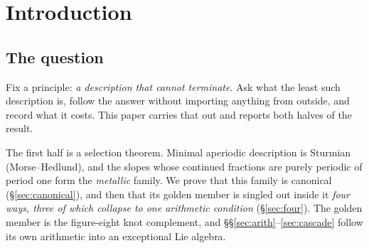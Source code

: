 \documentclass[11pt,reqno]{amsart}
\theoremstyle{plain}
\theoremstyle{definition}
\theoremstyle{remark}
\newcommand{\Q}{\mathbb{Q}}
\newcommand{\Z}{\mathbb{Z}}
\newcommand{\SU}{\mathrm{SU}}
\newcommand{\su}{\mathfrak{su}}
\newcommand{\uu}{\mathfrak{u}}
\newcommand{\ee}{\mathfrak{e}}
\newcommand{\disc}{\operatorname{disc}}
\begin{document}
\begin{abstract}
We prove that $C$ is toral and not merely abelian, so every centralizer arising in the
cascade is a Levi subalgebra. Hence the terminal type $A_2\oplus A_1$ is forced by the
classification of Levi subsystems of $\ee_6$, the exact computation supplying only the
integer $14$; the rung dimensions are exactly an explicit eleven-element set,
every value of which is attained; and the
second measurement can be enumerated rather than sampled. The charge field is computed
exactly: $K\cong\Q[x]/(x^3-12x-5)$, monogenic, totally real, of discriminant
$\disc K=6237=3^4\cdot7\cdot11$ and class number one. One stratum has Levi type $A_4$;
we record separately, and do not claim as a consequence, the textbook fact that
$\SU(5)$ contains $\su(3)\oplus\su(2)\oplus\uu(1)$ with kernel exactly $\Z/6$.

We report the ceiling with equal weight, because it is a theorem about the method and
not a limit of effort: every centralizer of a subset of $C$ contains a Cartan
subalgebra, so every rung has rank $6$, and any target of lower rank is unreachable by
any sequence of measurements \emph{taken inside $C$}---a hypothesis we flag rather than
drop, since it does not extend to operations outside a fixed Cartan. We make no physical identification, and we do not treat
real forms.
\end{abstract}

\maketitle
\tableofcontents

\section{Introduction}\label{sec:intro}

\subsection{The question}
Fix a principle: \emph{a description that cannot terminate}. Ask what the least such
description is, follow the answer without importing anything from outside, and record
what it costs. This paper carries that out and reports both halves of the result.

The first half is a selection theorem. Minimal aperiodic description is Sturmian
(Morse--Hedlund), and the slopes whose continued fractions are purely periodic of
period one form the \emph{metallic} family. We prove that this family is canonical
(\S\ref{sec:canonical}), and then that its golden member is singled out inside it
\emph{four ways, three of which collapse to one arithmetic condition}
(\S\ref{sec:four}). The golden member is the figure-eight
knot complement, and \S\S\ref{sec:arith}--\ref{sec:cascade} follow its own arithmetic
into an exceptional Lie algebra.
\end{document}
